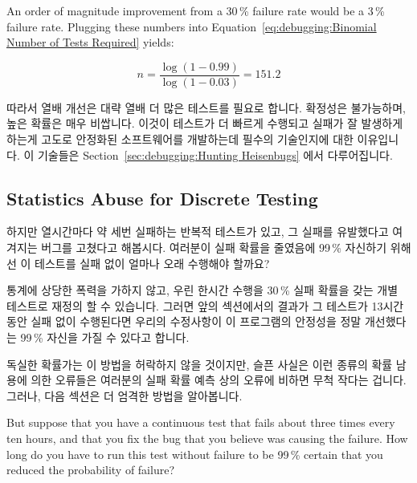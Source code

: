 An order of magnitude improvement from a 30\,\% failure rate would be
a 3\,\% failure rate.
Plugging these numbers into
Equation~\ref{eq:debugging:Binomial Number of Tests Required} yields:

\fi

\begin{equation}
	n = \frac{\log\left(1 - 0.99\right)}{\log\left(1 - 0.03\right)} = 151.2
\end{equation}

따라서 열배 개선은 대략 열배 더 많은 테스트를 필요로 합니다.
확정성은 불가능하며, 높은 확률은 매우 비쌉니다.
이것이 테스트가 더 빠르게 수행되고 실패가 잘 발생하게 하는게 고도로 안정화된
소프트웨어를 개발하는데 필수의 기술인지에 대한 이유입니다.
이 기술들은
Section~\ref{sec:debugging:Hunting Heisenbugs} 에서 다루어집니다.

\subsection{Statistics Abuse for Discrete Testing}
\label{sec:debugging:Statistics Abuse for Discrete Testing}

하지만 열시간마다 약 세번 실패하는 반복적 테스트가 있고, 그 실패를 유발했다고
여겨지는 버그를 고쳤다고 해봅시다.
여러분이 실패 확률을 줄였음에 99\,\% 자신하기 위해선 이 테스트를 실패 없이
얼마나 오래 수행해야 할까요?

통계에 상당한 폭력을 가하지 않고, 우린 한시간 수행을 30\,\% 실패 확률을 갖는
개별 테스트로 재정의 할 수 있습니다.
그러면 앞의 섹션에서의 결과가 그 테스트가 13시간동안 실패 없이 수행된다면
우리의 수정사항이 이 프로그램의 안정성을 정말 개선했다는 99\,\% 자신을 가질 수
있다고 합니다.

독실한 확률가는 이 방법을 허락하지 않을 것이지만, 슬픈 사실은 이런 종류의 확률
남용에 의한 오류들은 여러분의 실패 확률 예측 상의 오류에 비하면 무척 작다는
겁니다.
그러나, 다음 섹션은 더 엄격한 방법을 알아봅니다.

\iffalse

But suppose that you have a continuous test that fails about three
times every ten hours, and that you fix the bug that you believe was
causing the failure.
How long do you have to run this test without failure to be 99\,\% certain
that you reduced the probability of failure?

